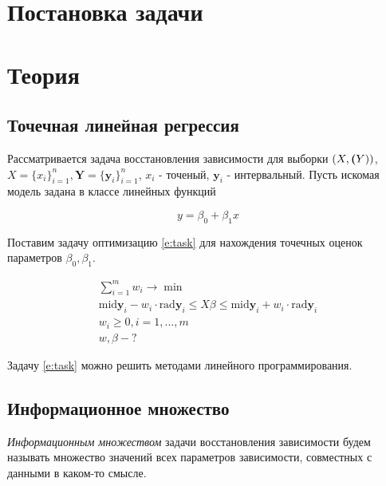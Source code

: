 \documentclass[a4paper,12pt]{article}
\begin{document}
    
    \newpage

    \tableofcontents
    \listoffigures
    \newpage

    \section{Постановка задачи}
    \section{Теория}
    \subsection{Точечная линейная регрессия}
    \quad Рассматривается задача восстановления зависимости для выборки
    $ (X, \textbf(Y))$, $ X = \{x_i\}_{i=1}^{n}, \textbf{Y} = \{\textbf{y}_i\}_{i=1}^{n} $,
    $ x_i $ - точеный, $ \textbf{y}_i $ - интервальный.
    Пусть искомая модель задана в классе линейных функций

    \begin{equation}
        y = \beta_0 + \beta_1 x
    \end{equation}

    Поставим задачу оптимизацию \ref{e:task} для нахождения точечных оценок
    параметров $ \beta_0, \beta_1 $.

    \begin{equation}
        \begin{gathered}
            \sum_{i = 1}^{m}w_{i} \to \min \\
            \text{mid}\textbf{y}_{i} - w_{i} \cdot \text{rad}\textbf{y}_{i} \leq X\beta \leq \text{mid}\textbf{y}_{i} + w_{i} \cdot \text{rad}\textbf{y}_{i} \\
            w_{i} \geq 0, i = 1, ..., m \\
            w, \beta - ?
        \end{gathered}
        \label{e:task}
    \end{equation}
    
    Задачу \ref{e:task} можно решить методами линейного программирования.

    \subsection{Информационное множество}
    \quad \textsl{Информационным множеством} задачи восстановления зависимости
    будем называть множество значений всех параметров зависимости,
    совместных с данными в каком-то смысле. 
\end{document}

